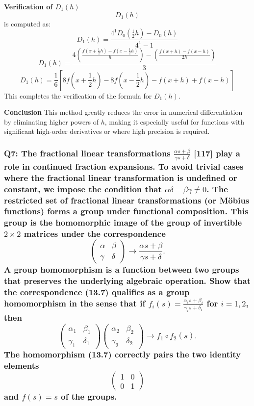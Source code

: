 \documentclass[8pt]{article}
\begin{document}
\textbf{Verification of \( D_1(h) \)}
\[ D_1(h) \] is computed as:
\[ D_1(h) = \frac{4^1 D_0(\frac{1}{2}h) - D_0(h)}{4^1 - 1} \]
\[ D_1(h) = \frac{4 \left(\frac{f(x+\frac{1}{2}h) - f(x-\frac{1}{2}h)}{h}\right) - \left(\frac{f(x+h) - f(x-h)}{2h}\right)}{3} \]
\[ D_1(h) = \frac{1}{6} \left[ 8f(x+\frac{1}{2}h) - 8f(x-\frac{1}{2}h) - f(x+h) + f(x-h) \right] \]
This completes the verification of the formula for \( D_1(h) \).

\textbf{Conclusion}
This method greatly reduces the error in numerical differentiation by eliminating higher powers of \( h \), making it especially useful for functions with significant high-order derivatives or where high precision is required.

\subsubsection*{Q7: The fractional linear transformations \( \frac{\alpha s + \beta}{\gamma s + \delta} \) [117] play a role in continued fraction expansions. To avoid trivial cases where the fractional linear transformation is undefined or constant, we impose the condition that \( \alpha \delta - \beta \gamma \neq 0 \). The restricted set of fractional linear transformations (or Möbius functions) forms a group under functional composition. This group is the homomorphic image of the group of invertible \( 2 \times 2 \) matrices under the correspondence
\[
\begin{pmatrix}
\alpha & \beta \\
\gamma & \delta
\end{pmatrix}
\longrightarrow \frac{\alpha s + \beta}{\gamma s + \delta}.
\]
A group homomorphism is a function between two groups that preserves the underlying algebraic operation. Show that the correspondence (13.7) qualifies as a group homomorphism in the sense that if \( f_i(s) = \frac{\alpha_i s + \beta_i}{\gamma_i s + \delta_i} \) for \( i = 1, 2 \), then
\[
\begin{pmatrix}
\alpha_1 & \beta_1 \\
\gamma_1 & \delta_1
\end{pmatrix}
\begin{pmatrix}
\alpha_2 & \beta_2 \\
\gamma_2 & \delta_2
\end{pmatrix}
\longrightarrow f_1 \circ f_2(s).
\]
The homomorphism (13.7) correctly pairs the two identity elements 
\[
\begin{pmatrix}
1 & 0 \\
0 & 1
\end{pmatrix}
\]
and \( f(s) = s \) of the groups.}
\end{document}
